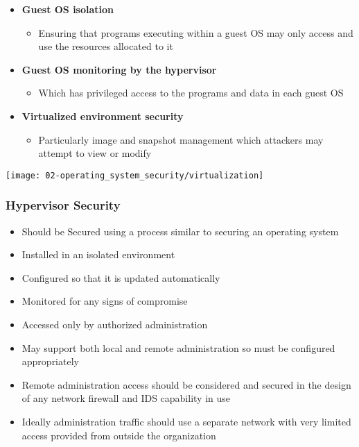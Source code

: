 \begin{minipage}{0.5\linewidth}
    \begin{itemize}
        \item \textbf{Guest OS isolation}
        \begin{itemize}
            \item Ensuring that programs executing within a guest OS may only access and use the resources allocated to it
        \end{itemize}
        \item \textbf{Guest OS monitoring by the hypervisor}
        \begin{itemize}
            \item Which has privileged access to the programs and data in each guest OS
        \end{itemize}
        \item \textbf{Virtualized environment security}
        \begin{itemize}
            \item Particularly image and snapshot management which attackers may attempt to view or modify
        \end{itemize}
    \end{itemize}
\end{minipage}
\begin{minipage}{0.45\linewidth}
    \begin{center}
        \texttt{[image: 02-operating\_system\_security/virtualization]}
        \vspace{-8pt}
    \end{center}
\end{minipage}

\subsubsection{Hypervisor Security}
\begin{itemize}
    \item Should be Secured using a process similar to securing an operating system
    \item Installed in an isolated environment
    \item Configured so that it is updated automatically
    \item Monitored for any signs of compromise
    \item Accessed only by authorized administration
    \item May support both local and remote administration so must be configured appropriately
    \item Remote administration access should be considered and secured in the design of any network firewall and IDS capability in use
    \item Ideally administration traffic should use a separate network with very limited access provided from outside the organization
\end{itemize}

